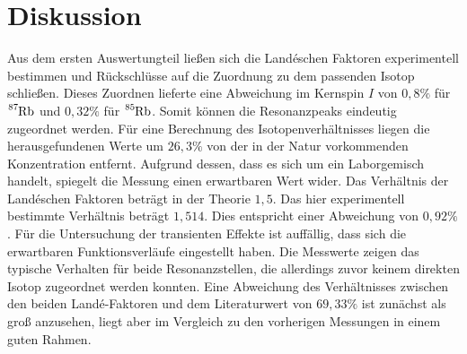 \section{Diskussion}
Aus dem ersten Auswertungteil ließen sich die Landéschen Faktoren experimentell bestimmen und Rückschlüsse auf die Zuordnung zu dem passenden Isotop schließen. Dieses Zuordnen lieferte eine Abweichung im Kernspin $I$ von $0,8\%$ für $\ce{^{87}Rb}$ und $0,32\%$ für $\ce{^{85}Rb}$. Somit können die Resonanzpeaks eindeutig zugeordnet werden.
Für eine Berechnung des Isotopenverhältnisses liegen die herausgefundenen Werte um $26,3\%$ von der in der Natur vorkommenden Konzentration entfernt.
Aufgrund dessen, dass es sich um ein Laborgemisch handelt, spiegelt die Messung einen erwartbaren Wert wider.
Das Verhältnis der Landéschen Faktoren beträgt in der Theorie $1,5$. Das hier experimentell bestimmte Verhältnis beträgt $1,514$. Dies entspricht einer Abweichung von $0,92\%$.
Für die Untersuchung der transienten Effekte ist auffällig, dass sich die erwartbaren Funktionsverläufe eingestellt haben.
Die Messwerte zeigen das typische Verhalten für beide Resonanzstellen, die allerdings zuvor keinem direkten Isotop zugeordnet werden konnten. Eine Abweichung des Verhältnisses zwischen den beiden Landé-Faktoren und dem Literaturwert von $69,33\%$ ist zunächst als groß anzusehen, liegt aber im Vergleich zu den vorherigen Messungen in einem guten Rahmen.
